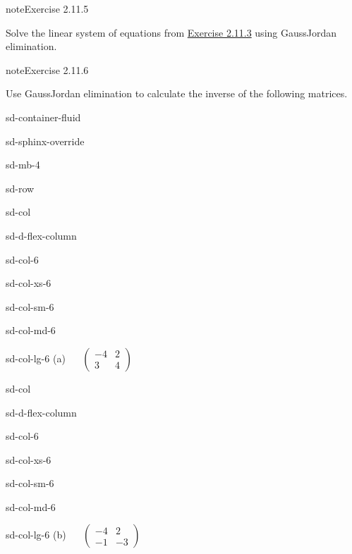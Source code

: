 \documentclass[letterpaper,10pt,english]{jupyterBook}
\begin{document}
\begin{sphinxadmonition}{note}{Exercise 2.11.5}



\sphinxAtStartPar
Solve the linear system of equations from \hyperref[exercise:systems-ex-gelim]{Exercise 2.11.3} using Gauss\sphinxhyphen{}Jordan elimination.
\end{sphinxadmonition}
 \label{exercise:systems-ex-gj-inverse}

\begin{sphinxadmonition}{note}{Exercise 2.11.6}



\sphinxAtStartPar
Use Gauss\sphinxhyphen{}Jordan elimination to calculate the inverse of the following matrices.

\begin{sphinxuseclass}{sd-container-fluid}
\begin{sphinxuseclass}{sd-sphinx-override}
\begin{sphinxuseclass}{sd-mb-4}
\begin{sphinxuseclass}{sd-row}
\begin{sphinxuseclass}{sd-col}
\begin{sphinxuseclass}{sd-d-flex-column}
\begin{sphinxuseclass}{sd-col-6}
\begin{sphinxuseclass}{sd-col-xs-6}
\begin{sphinxuseclass}{sd-col-sm-6}
\begin{sphinxuseclass}{sd-col-md-6}
\begin{sphinxuseclass}{sd-col-lg-6}
\sphinxAtStartPar
(a)  
\( \begin{pmatrix} -4 & 2 \\ 3 & 4 \end{pmatrix} \)

\end{sphinxuseclass}
\end{sphinxuseclass}
\end{sphinxuseclass}
\end{sphinxuseclass}
\end{sphinxuseclass}
\end{sphinxuseclass}
\end{sphinxuseclass}
\begin{sphinxuseclass}{sd-col}
\begin{sphinxuseclass}{sd-d-flex-column}
\begin{sphinxuseclass}{sd-col-6}
\begin{sphinxuseclass}{sd-col-xs-6}
\begin{sphinxuseclass}{sd-col-sm-6}
\begin{sphinxuseclass}{sd-col-md-6}
\begin{sphinxuseclass}{sd-col-lg-6}
\sphinxAtStartPar
(b)  
\( \begin{pmatrix} -4 & 2 \\ -1 & -3 \end{pmatrix} \)


\end{sphinxuseclass}
\end{sphinxuseclass}
\end{sphinxuseclass}
\end{sphinxuseclass}
\end{sphinxuseclass}
\end{sphinxuseclass}
\end{sphinxuseclass}
\end{sphinxuseclass}
\end{sphinxuseclass}
\end{sphinxuseclass}
\end{sphinxuseclass}
\end{sphinxadmonition}
\end{document}
